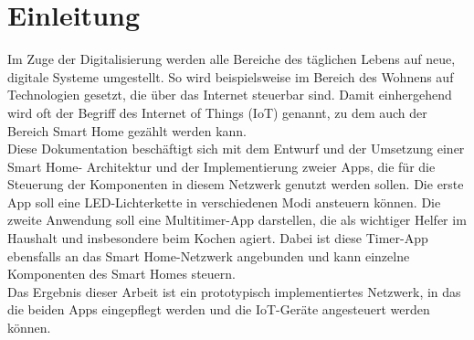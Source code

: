\chapter{Einleitung}

Im Zuge der Digitalisierung werden alle Bereiche des täglichen Lebens auf neue, digitale Systeme umgestellt. So wird beispielsweise im Bereich des Wohnens auf Technologien gesetzt, die über das Internet steuerbar sind. Damit einhergehend wird oft der Begriff des Internet of Things (IoT) genannt, zu dem auch der Bereich Smart Home gezählt werden kann.\\
Diese Dokumentation beschäftigt sich mit dem Entwurf und der Umsetzung einer Smart Home- Architektur und der Implementierung zweier Apps, die für die Steuerung der Komponenten in diesem Netzwerk genutzt werden sollen. Die erste App soll eine LED-Lichterkette in verschiedenen Modi ansteuern können. Die zweite Anwendung soll eine Multitimer-App darstellen, die als wichtiger Helfer im Haushalt und insbesondere beim Kochen agiert. Dabei ist diese Timer-App ebensfalls an das Smart Home-Netzwerk angebunden und kann einzelne Komponenten des Smart Homes steuern. \\
Das Ergebnis dieser Arbeit ist ein prototypisch implementiertes Netzwerk, in das die beiden Apps eingepflegt werden und die IoT-Geräte angesteuert werden können.